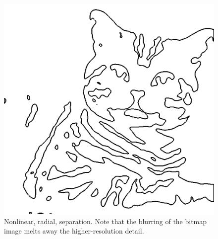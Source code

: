 \documentclass[12pt]{article}
\begin{document}
\begin{figure} 
\centering
  \includegraphics[width = 3 in]{cat_blurred_isosurface.png}
  \caption{Nonlinear, radial, separation.
Note that the blurring of the bitmap image melts away the higher-resolution detail.
}
\end{figure}
\end{document}
